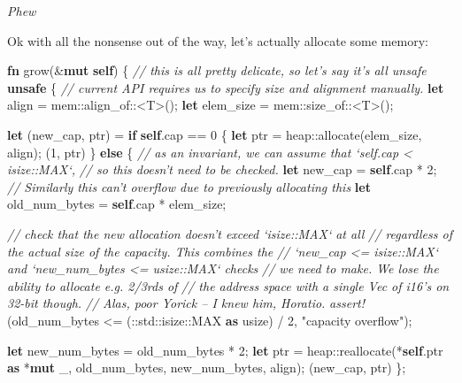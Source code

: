 \documentclass[a4paper,]{book}
\newenvironment{Shaded}{\begin{snugshade}}{\end{snugshade}}
\newcommand{\KeywordTok}[1]{\textcolor[rgb]{0.13,0.29,0.53}{\textbf{{#1}}}}
\newcommand{\DataTypeTok}[1]{\textcolor[rgb]{0.13,0.29,0.53}{{#1}}}
\newcommand{\DecValTok}[1]{\textcolor[rgb]{0.00,0.00,0.81}{{#1}}}
\newcommand{\StringTok}[1]{\textcolor[rgb]{0.31,0.60,0.02}{{#1}}}
\newcommand{\CommentTok}[1]{\textcolor[rgb]{0.56,0.35,0.01}{\textit{{#1}}}}
\newcommand{\PreprocessorTok}[1]{\textcolor[rgb]{0.56,0.35,0.01}{\textit{{#1}}}}
\newcommand{\NormalTok}[1]{{#1}}
\begin{document}
\emph{Phew}

Ok with all the nonsense out of the way, let's actually allocate some
memory:

\begin{Shaded}
\begin{Highlighting}[]
\KeywordTok{fn} \NormalTok{grow(&}\KeywordTok{mut} \KeywordTok{self}\NormalTok{) \{}
    \CommentTok{// this is all pretty delicate, so let's say it's all unsafe}
    \KeywordTok{unsafe} \NormalTok{\{}
        \CommentTok{// current API requires us to specify size and alignment manually.}
        \KeywordTok{let} \NormalTok{align = mem::align_of::<T>();}
        \KeywordTok{let} \NormalTok{elem_size = mem::size_of::<T>();}

        \KeywordTok{let} \NormalTok{(new_cap, ptr) = }\KeywordTok{if} \KeywordTok{self}\NormalTok{.cap == }\DecValTok{0} \NormalTok{\{}
            \KeywordTok{let} \NormalTok{ptr = heap::allocate(elem_size, align);}
            \NormalTok{(}\DecValTok{1}\NormalTok{, ptr)}
        \NormalTok{\} }\KeywordTok{else} \NormalTok{\{}
            \CommentTok{// as an invariant, we can assume that `self.cap < isize::MAX`,}
            \CommentTok{// so this doesn't need to be checked.}
            \KeywordTok{let} \NormalTok{new_cap = }\KeywordTok{self}\NormalTok{.cap * }\DecValTok{2}\NormalTok{;}
            \CommentTok{// Similarly this can't overflow due to previously allocating this}
            \KeywordTok{let} \NormalTok{old_num_bytes = }\KeywordTok{self}\NormalTok{.cap * elem_size;}

            \CommentTok{// check that the new allocation doesn't exceed `isize::MAX` at all}
            \CommentTok{// regardless of the actual size of the capacity. This combines the}
            \CommentTok{// `new_cap <= isize::MAX` and `new_num_bytes <= usize::MAX` checks}
            \CommentTok{// we need to make. We lose the ability to allocate e.g. 2/3rds of}
            \CommentTok{// the address space with a single Vec of i16's on 32-bit though.}
            \CommentTok{// Alas, poor Yorick -- I knew him, Horatio.}
            \PreprocessorTok{assert!}\NormalTok{(old_num_bytes <= (::std::}\DataTypeTok{isize}\NormalTok{::MAX }\KeywordTok{as} \DataTypeTok{usize}\NormalTok{) / }\DecValTok{2}\NormalTok{,}
                    \StringTok{"capacity overflow"}\NormalTok{);}

            \KeywordTok{let} \NormalTok{new_num_bytes = old_num_bytes * }\DecValTok{2}\NormalTok{;}
            \KeywordTok{let} \NormalTok{ptr = heap::reallocate(*}\KeywordTok{self}\NormalTok{.ptr }\KeywordTok{as} \NormalTok{*}\KeywordTok{mut} \NormalTok{_,}
                                        \NormalTok{old_num_bytes,}
                                        \NormalTok{new_num_bytes,}
                                        \NormalTok{align);}
            \NormalTok{(new_cap, ptr)}
        \NormalTok{\};}


\end{Highlighting}
\end{Shaded}
\end{document}

